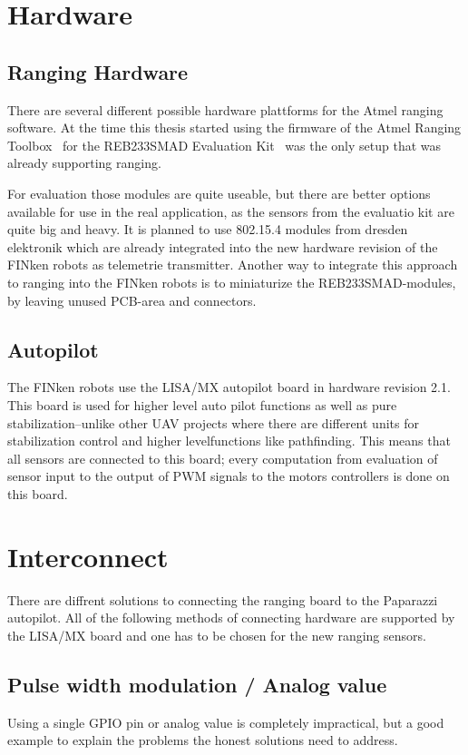 \section{Hardware}

\subsection{Ranging Hardware}

There are several different possible hardware plattforms for the Atmel ranging software.
At the time this thesis started using the firmware of the Atmel Ranging Toolbox~\cite{atmelrtb} for the REB233SMAD Evaluation Kit~\cite{REB233SMAD} was the only setup that was already supporting ranging.

For evaluation those modules are quite useable, but there are better options available for use in the real application, as the sensors from the evaluatio kit are quite big and heavy.
It is planned to use 802.15.4 modules from dresden elektronik which are already integrated into the new hardware revision of the FINken robots as telemetrie transmitter.
Another way to integrate this approach to ranging into the FINken robots is to miniaturize the REB233SMAD-modules, by leaving unused PCB-area and connectors.

\subsection{Autopilot}
The FINken robots use the LISA/MX autopilot board in hardware revision 2.1.
This board is used for higher level auto pilot functions as well as pure stabilization–unlike other UAV projects where there are different units for stabilization control and higher levelfunctions like pathfinding.
This means that all sensors are connected to this board; every computation from evaluation of sensor input to the output of PWM signals to the motors controllers is done on this board.

\section{Interconnect}
There are diffrent solutions to connecting the ranging board to the Paparazzi autopilot.
All of the following methods of connecting hardware are supported by the LISA/MX board and one has to be chosen for the new ranging sensors.


\subsection{Pulse width modulation / Analog value}
Using a single GPIO pin or analog value is completely impractical, but a good example to explain the problems the honest solutions need to address.


